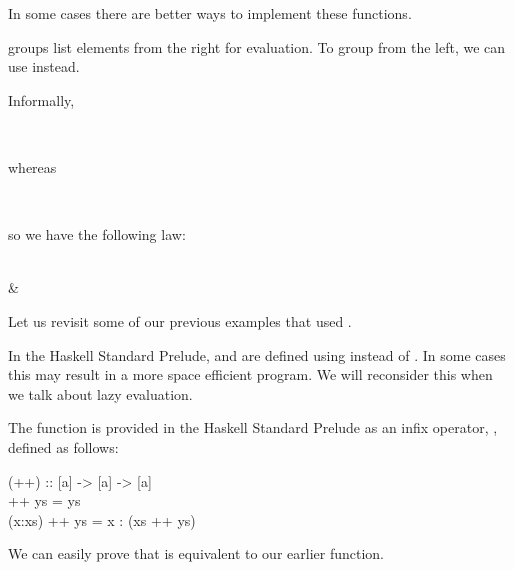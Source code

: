 \documentclass{seminar}
\begin{document}
\begin{slide}
In some cases there are better ways to implement these functions.

\newslide

 groups list elements from the right for evaluation.
To group from the left, we can use  instead.

Informally,

\begin{codenott}
\meq\\
\> 
\end{codenott}

whereas

\begin{codenott}
\meq\\
\> 
\end{codenott}

so we have the following law:

\begin{laws}
\meq\\
\hspace{0.075in} & \\
\end{laws}

\newslide

Let us revisit some of our previous examples that used .

In the Haskell Standard Prelude,  and  are defined
using  instead of .  In some cases this may
result in a more space efficient program.  We will reconsider this
when we talk about lazy evaluation.

\newslide

The  function is provided in the Haskell Standard Prelude
as an infix operator, \textcd{++}, defined as follows:

\begin{code}
(++) :: [a] -> [a] -> [a]\\
[]     ++ ys = ys\\
(x:xs) ++ ys = x : (xs ++ ys)
\end{code}

We can easily prove that \textcd{++} is equivalent to
our earlier  function.


\end{slide}
\end{document}
